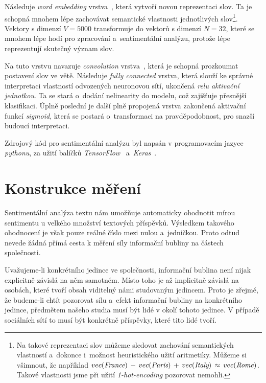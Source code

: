 \documentclass[12pt, a4paper]{article}
\numberwithin{equation}{section} 	%
\begin{document}
Následuje \textit{word embedding} vrstva~\cite{WordEmbedding1, WordEmbedding2}, která vytvoří novou reprezentaci slov. Ta je schopná mnohem lépe zachovávat semantické vlastnosti jednotlivých slov\footnote{Na takové reprezentaci slov můžeme sledovat zachování semantických vlastností a~dokonce i~možnost heuristického užití aritmetiky. Můžeme si všimnout, že například $vec(\textit{France})\nobreak\hspace{.16667em plus .08333em}-\nobreak\hspace{.16667em plus .08333em} vec(\textit{Paris})\,+\,vec(\textit{Italy})\,\approx\,vec(\textit{Rome})$. Takové vlastnosti jsme při užití \textit{1-hot-encoding} pozorovat nemohli.}. Vektory s dimenzí $V = 5000$ transformuje do vektorů s dimenzí $N = 32$, které se mnohem lépe hodí pro zpracování a~sentimentální analýzu, protože lépe reprezentují skutečný význam slov.

Na tuto vrstvu navazuje \textit{convolution} vrstva~\cite{CNN}, která je schopná prozkoumat postavení slov ve větě. Následuje \textit{fully connected} vrstva, která slouží ke správné interpretaci vlastností odvozených neuronovou sítí, ukončená \textit{relu aktivační jednotkou}. Ta se stará o~dodání nelinearity do modelu, což zajišťuje přesnější klasifikaci. Úplně poslední je další plně propojená vrstva zakončená aktivační funkcí \textit{sigmoid}, která se postará o~transformaci na pravděpodobnost, pro snazší budoucí interpretaci.

Zdrojový kód pro sentimentální analýzu byl napsán v programovacím jazyce \textit{pythonu}, za užití balíčků \textit{TensorFlow}~\cite{TensorFlow} a~\textit{Keras}~\cite{keras}.

\newpage
\section{Konstrukce měření}
\noindent Sentimentální analýza textu nám umožňuje automaticky ohodnotit mírou sentimentu u velkého množství textových příspěvků. Výsledkem takového ohodnocení je však pouze reálné číslo mezi nulou a~jedničkou. Proto odtud nevede žádná přímá cesta k měření síly informační bubliny na částech společnosti. %

Uvažujeme-li konkrétního jedince ve společnosti, informační bublina není nijak explicitně závislá na něm samotném. Místo toho je až implicitně závislá na osobách, které tvoří obsah viditelný námi studovaným jedincem. Proto je zřejmé, že budeme-li chtít pozorovat sílu a~efekt informační bubliny na konkrétního jedince, předmětem našeho studia musí být lidé v okolí tohoto jedince. V případě sociálních sítí to musí být konkrétně příspěvky, které tito lidé tvoří.
\end{document}
